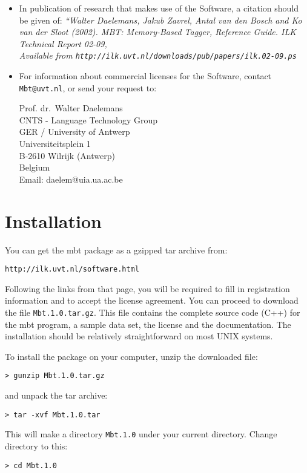 \documentclass{report}
\begin{document}
\begin{itemize}
\item In publication of research that makes use of the Software, a
citation should be given of: {\em ``Walter Daelemans, Jakub Zavrel,
Antal van den Bosch and Ko van der Sloot (2002). MBT: Memory-Based
Tagger, Reference Guide. ILK Technical Report 02-09, \\
Available from
{\tt http://ilk.uvt.nl/downloads/pub/papers/ilk.02-09.ps}}

\item For information about commercial licenses for the Software,
contact {\tt Mbt@uvt.nl}, or send your request to:

Prof. dr.~Walter Daelemans\\
CNTS - Language Technology Group\\
GER / University of Antwerp\\
Universiteitsplein 1\\
B-2610 Wilrijk (Antwerp)\\
Belgium\\
Email: daelem@uia.ua.ac.be

\end{itemize}

\pagestyle{headings}

\chapter{Installation}
\vspace{-1cm}
You can get the {\sc mbt} package as a gzipped tar archive from:

{\tt http://ilk.uvt.nl/software.html}

Following the links from that page, you will be required to fill in
registration information and to accept the license agreement. You can
proceed to download the file {\tt Mbt.1.0.tar.gz}. This file contains
the complete source code (C++) for the {\sc mbt} program, a sample
data set, the license and the documentation. The installation should
be relatively straightforward on most UNIX systems.

To install the package on your computer, unzip the downloaded file:

{\tt > gunzip Mbt.1.0.tar.gz}

and unpack the tar archive:

{\tt > tar -xvf Mbt.1.0.tar}

This will make a directory {\tt Mbt.1.0} under your 
current directory. Change directory to this:

{\tt > cd Mbt.1.0}
\end{document}
